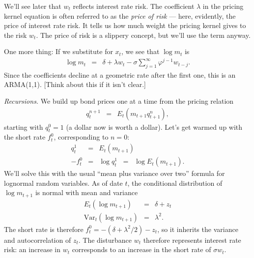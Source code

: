 \documentclass[11pt]{article}
\begin{document}
We'll see later that $w_t$ reflects interest rate risk.
The coefficient $\lambda$ in the pricing kernel equation is often referred to as
the {\it price of risk\/} --- here, evidently, the price of interest rate risk.
It tells us how much weight the pricing kernel gives to the risk $w_t$.
The price of risk is a slippery concept, but we'll use the term anyway.

One more thing:
If we substitute for $x_t$, we see that $\log m_t$ is
\begin{eqnarray}
    \log m_t &=& \delta + \lambda w_t - \sigma \sum_{j=1}^\infty \varphi^{j-1} w_{t-j} .
    \label{eq:vasicek-ma}
\end{eqnarray}
Since the coefficients decline at a geometric rate after the first one,
this is an ARMA(1,1).
[Think about this if it isn't clear.]

{\it Recursions.\/}
We build up bond prices one at a time from
the pricing relation
\begin{eqnarray*}
    q^{n+1}_t &=& E_t \left( m_{t+1} q^n_{t+1} \right) ,
\end{eqnarray*}
starting with $q^0_t = 1$ (a dollar now is worth a dollar).
Let's get warmed up with the short rate $f^0_t$, corresponding
to $n=0$:
\begin{eqnarray*}
    q^1_t   &=&  E_t (m_{t+1}) \\
    - f^0_t &=&  \log q^1_{t} \;\;=\;\; \log E_t (m_{t+1}) .
\end{eqnarray*}
We'll solve this with the usual ``mean plus variance over two''
formula for lognormal random variables.
As of date $t$,
the conditional distribution of $\log m_{t+1}$ is
normal with mean and variance
\begin{eqnarray*}
    E_t \left( \log m_{t+1}\right) &=& \delta + z_t \\
    \mbox{Var}_t \left( \log m_{t+1} \right) &=& \lambda^2 .
\end{eqnarray*}
The short rate is therefore
$ f^0_t =  - (\delta + \lambda^2/2) - z_t$,
so it inherits the variance and autocorrelation of $z_t$.
The disturbance $w_t$ therefore represents interest rate risk:
an increase in $w_t$ corresponds to an increase in the short rate
of $\sigma w_t$.
\end{document}
